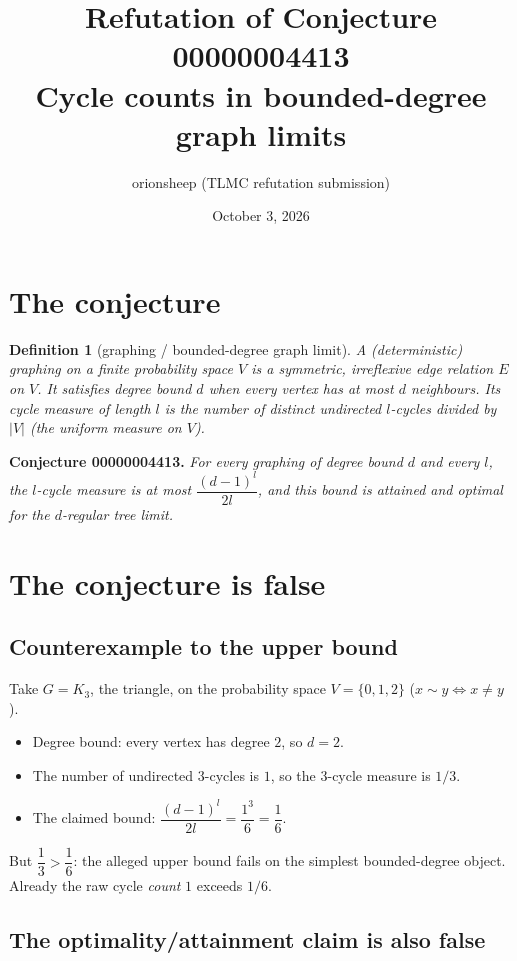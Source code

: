\documentclass[11pt]{article}
\title{Refutation of Conjecture 00000004413\\
\large Cycle counts in bounded-degree graph limits}
\author{orionsheep (TLMC refutation submission)}
\date{October 3, 2026}
\newtheorem{definition}{Definition}
\begin{document}
\maketitle

\section{The conjecture}

\begin{definition}[graphing / bounded-degree graph limit]
A (deterministic) graphing on a finite probability space $V$ is a symmetric,
irreflexive edge relation $E$ on $V$.  It satisfies \emph{degree bound} $d$
when every vertex has at most $d$ neighbours.  Its \emph{cycle measure} of
length $l$ is the number of distinct undirected $l$-cycles divided by $|V|$
(the uniform measure on $V$).
\end{definition}

\noindent\textbf{Conjecture 00000004413.} \emph{For every graphing of degree
bound $d$ and every $l$, the $l$-cycle measure is at most
$\dfrac{(d-1)^l}{2l}$, and this bound is attained and optimal for the
$d$-regular tree limit.}

\section{The conjecture is false}

\subsection{Counterexample to the upper bound}

Take $G = K_3$, the triangle, on the probability space $V = \{0,1,2\}$
($x\sim y \iff x\neq y$).

\begin{itemize}
  \item Degree bound: every vertex has degree $2$, so $d = 2$.
  \item The number of undirected $3$-cycles is $1$, so the $3$-cycle measure
        is $1/3$.
  \item The claimed bound: $\dfrac{(d-1)^l}{2l} = \dfrac{1^3}{6} = \dfrac16$.
\end{itemize}

\noindent But $\dfrac13 > \dfrac16$: the alleged upper bound fails on the
simplest bounded-degree object.  Already the raw cycle \emph{count} $1$
exceeds $1/6$.

\subsection{The optimality/attainment claim is also false}
\end{document}

